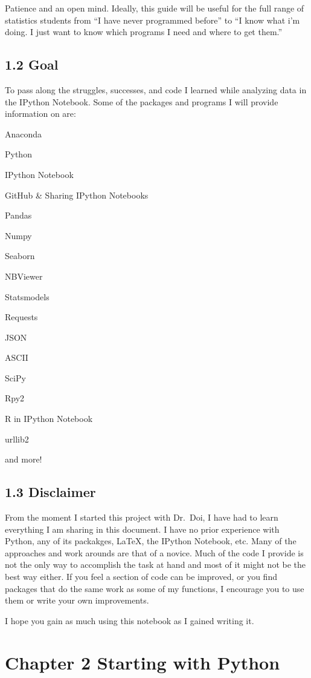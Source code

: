 \documentclass{article}
\begin{document}
    Patience and an open mind. Ideally, this guide will be useful for the
full range of statistics students from ``I have never programmed
before'' to ``I know what i'm doing. I just want to know which programs
I need and where to get them.''


    \subsection{1.2 Goal}


    To pass along the struggles, successes, and code I learned while
analyzing data in the IPython Notebook. Some of the packages and
programs I will provide information on are:

Anaconda

Python

IPython Notebook

GitHub \& Sharing IPython Notebooks

Pandas

Numpy

Seaborn

NBViewer

Statsmodels

Requests

JSON

ASCII

SciPy

Rpy2

R in IPython Notebook

urllib2

and more!


    \subsection{1.3 Disclaimer}


    From the moment I started this project with Dr.~Doi, I have had to learn
everything I am sharing in this document. I have no prior experience
with Python, any of its packakges, LaTeX, the IPython Notebook, etc.
Many of the approaches and work arounds are that of a novice. Much of
the code I provide is not the only way to accomplish the task at hand
and most of it might not be the best way either. If you feel a section
of code can be improved, or you find packages that do the same work as
some of my functions, I encourage you to use them or write your own
improvements.

I hope you gain as much using this notebook as I gained writing it. 


    \section{Chapter 2 Starting with Python}
\end{document}
